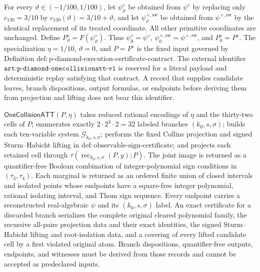 For every \(\vartheta\in(-1/100,1/100)\), let
\(\psi^{\diamond}_{\vartheta}\) be obtained from \(\psi^{\diamond}\) by
replacing only \(c_{130}=3/10\) by
\(c_{130}(\vartheta)=3/10+\vartheta\), and let
\(\psi^{\diamond,\mathrm{sw}}_{\vartheta}\) be obtained from
\(\psi^{\diamond,\mathrm{sw}}\) by the identical replacement of its treated
coordinate. All other primitive coordinates are unchanged. Define
\(P^{\diamond}_{\vartheta}=F(\psi^{\diamond}_{\vartheta})\). Thus
\(\psi^{\diamond}_{0}=\psi^{\diamond}\),
\(\psi^{\diamond,\mathrm{sw}}_{0}=\psi^{\diamond,\mathrm{sw}}\), and
\(P^{\diamond}_{0}=P^{\diamond}\). The specialization \(\eta=1/10\),
\(\vartheta=0\), and \(P=P^\diamond\) is the fixed input governed by
Definition \(\mathrm{def{:}p\text{-}diamond\text{-}execution\text{-}certificate\text{-}contract}\).
The external identifier
\(\texttt{art:p-diamond-onecollisionatt-v1}\) is reserved for a literal
payload and deterministic replay satisfying that contract. A record that
supplies candidate leaves, branch dispositions, output formulas, or endpoints
before deriving them from projection and lifting does not bear this
identifier.

\(\mathsf{OneCollisionATT}(P,\eta)\) takes reduced rational encodings of
\(\eta\) and the thirty-two cells of \(P\); enumerates exactly
\(2\cdot2^3\cdot2=32\) labeled branches \((k_0,s,\sigma)\); builds each
ten-variable system \(\mathscr G_{k_0,s,\sigma}\); performs the fixed Collins
projection and signed Sturm--Habicht lifting in
\(\mathrm{def{:}observable\text{-}sign\text{-}certificate}\); and projects
each retained cell through
\(\tau(\operatorname{rec}_{k_0,s,\sigma}(P,y);P)\). The joint image is
returned as a quantifier-free Boolean combination of integer-polynomial sign
conditions in \((\tau_3,\tau_4)\). Each marginal is returned as an ordered
finite union of closed intervals and isolated points whose endpoints have a
square-free integer polynomial, rational isolating interval, and Thom sign
sequence. Every endpoint carries a reconstructed real-algebraic \(\psi\) and
its \((k_0,s,\sigma)\) label. An exact certificate for a discarded branch
serializes the complete original cleared polynomial family, the recursive
all-pairs projection data and their exact identities, the signed
Sturm--Habicht lifting and root-isolation data, and a covering of every lifted
candidate cell by a first violated original atom. Branch dispositions,
quantifier-free outputs, endpoints, and witnesses must be derived from those
records and cannot be accepted as predeclared inputs.

